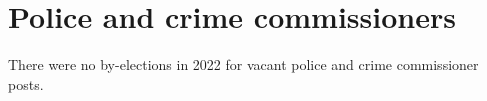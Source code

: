 \documentclass[a4paper,openany]{book}
\begin{document}
%
%

\section{Police and crime commissioners}

There were no by-elections in 2022 for vacant police and crime commissioner posts.
\end{document}
